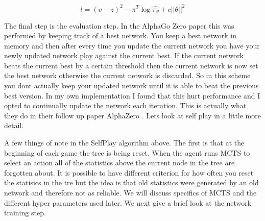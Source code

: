 \begin{equation}
    l = (v - z)^{2} - \pi^{T} \log{\hat{\pi_{\theta}}} + c||\theta||^{2}
\end{equation}

The final step is the evaluation step. In the AlphaGo Zero paper this was performed by keeping track of a best network. You keep a best network in memory and then after every time you update the current network you have your newly updated network play against the current best. If the current network beats the current best by a certain threshold then the current network is now set the best network otherwise the current network is discarded. So in this scheme you dont actually keep your updated network until it is able to beat the previous best version. In my own implementation I found that this hurt performance and I opted to continually update the network each iteration. This is actually what they do in their follow up paper AlphaZero \cite{alphagozero}. Lets look at self play in a little more detail. 


\begin{algorithm}[H]
\SetAlgoLined
{}
\end{algorithm}


A few things of note in the SelfPlay algorithm above. The first is that at the beginning of each game the tree is being reset. When the agent runs MCTS to select an action all of the statistics above the current node in the tree are forgotten about. It is possible to have different criterion for how often you reset the statisics in the tre but the idea is that old statistics were generated by an old network and therefore not as reliable. We will discuss specifics of MCTS and the different hyper parameters used later. We next give a brief look at the network training step. 

